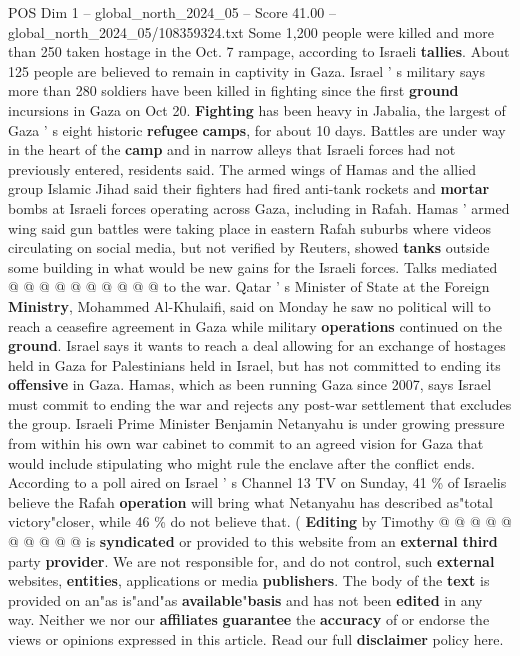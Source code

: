 \begin{textsample}{POS Dim 1 – global\_north\_2024\_05 – Score 41.00 – global\_north\_2024\_05/108359324.txt}
Some 1,200 people were killed and more than 250 taken hostage in the Oct. 7 rampage, according to Israeli \textbf{tallies}.
About 125 people are believed to remain in captivity in Gaza.
Israel ' s military says more than 280 soldiers have been killed in fighting since the first \textbf{ground} incursions in Gaza on Oct 20. \textbf{Fighting} has been heavy in Jabalia, the largest of Gaza ' s eight historic \textbf{refugee} \textbf{camps}, for about 10 days.
Battles are under way in the heart of the \textbf{camp} and in narrow alleys that Israeli forces had not previously entered, residents said.
The armed wings of Hamas and the allied group Islamic Jihad said their fighters had fired anti-tank rockets and \textbf{mortar} bombs at Israeli forces operating across Gaza, including in Rafah.
Hamas ' armed wing said gun battles were taking place in eastern Rafah suburbs where videos circulating on social media, but not verified by Reuters, showed \textbf{tanks} outside some building in what would be new gains for the Israeli forces.
Talks mediated @ @ @ @ @ @ @ @ @ @ to the war.
Qatar ' s Minister of State at the Foreign \textbf{Ministry}, Mohammed Al-Khulaifi, said on Monday he saw no political will to reach a ceasefire agreement in Gaza while military \textbf{operations} continued on the \textbf{ground}.
Israel says it wants to reach a deal allowing for an exchange of hostages held in Gaza for Palestinians held in Israel, but has not committed to ending its \textbf{offensive} in Gaza.
Hamas, which as been running Gaza since 2007, says Israel must commit to ending the war and rejects any post-war settlement that excludes the group.
Israeli Prime Minister Benjamin Netanyahu is under growing pressure from within his own war cabinet to commit to an agreed vision for Gaza that would include stipulating who might rule the enclave after the conflict ends.
According to a poll aired on Israel ' s Channel 13 TV on Sunday, 41 \% of Israelis believe the Rafah \textbf{operation} will bring what Netanyahu has described as"total victory"closer, while 46 \% do not believe that. ( \textbf{Editing} by Timothy @ @ @ @ @ @ @ @ @ @ is \textbf{syndicated} or provided to this website from an \textbf{external} \textbf{third} party \textbf{provider}.
We are not responsible for, and do not control, such \textbf{external} websites, \textbf{entities}, applications or media \textbf{publishers}.
The body of the \textbf{text} is provided on an"as is"and"as \textbf{available}"\textbf{basis} and has not been \textbf{edited} in any way.
Neither we nor our \textbf{affiliates} \textbf{guarantee} the \textbf{accuracy} of or endorse the views or opinions expressed in this article.
Read our full \textbf{disclaimer} policy here.

\end{textsample}
